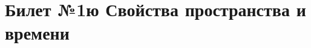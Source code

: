 \documentclass[a4paper]{article}
\begin{document}
\section{Билет №1ю Свойства пространства и времени}
\end{document}

